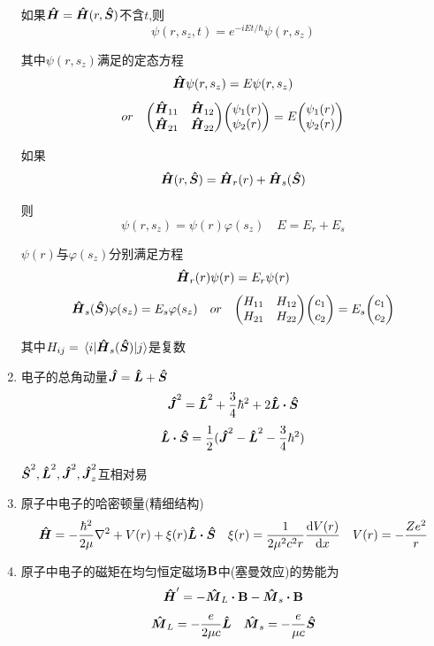 \documentclass{article}
\begin{document}
\begin{formal}
\begin{enumerate}
                  如果$\vu*{H} = \vu*{H}(r,\vu*{S})$不含$t$,则
                  $$ \psi(r,s_{z},t) = e^{-iEt/\hbar} \psi(r,s_{z}) $$

                  其中$\psi(r,s_{z})$满足的定态方程
                  $$ \vu*{H} \psi(r,s_{z}) = E \psi(r,s_{z}) $$
                  $$ 
                  or \quad \mqty(\vu*{H}_{11} & \vu*{H}_{12} \\ \vu*{H}_{21} & \vu*{H}_{22}) 
                  \mqty(\psi_{1}(r) \\ \psi_{2}(r)) = E \mqty( \psi_{1}(r) \\ \psi_{2}(r) )
                  $$

                  如果
                  $$ \vu*{H}(r,\vu*{S}) = \vu*{H}_{r}(r) + \vu*{H}_{s}(\vu*{S})  $$

                  则
                  $$ \psi(r,s_{z}) = \psi(r)\varphi(s_{z}) \quad E = E_{r} + E_{s} $$

                  $\psi(r)$与$\varphi(s_{z})$分别满足方程
                  $$ \vu*{H}_{r}(r) \psi(r) = E_{r}\psi(r) $$
                  $$ 
                  \vu*{H}_{s}(\vu*{S}) \varphi(s_{z}) = E_{s} \varphi(s_{z}) \quad or \quad 
                  \mqty(H_{11} & H_{12} \\ H_{21} & H_{22}) \mqty(c_{1} \\ c_{2}) = E_{s} \mqty(c_{1} \\ c_{2})
                  $$

                  其中$ H_{ij} = \mel{i}{\vu*{H}_{s}(\vu*{S})}{j}$是复数

                  \item 电子的总角动量$ \vu*{J} = \vu*{L} + \vu*{S} $
                  $$
                  \vu*{J}^{2} = \vu*{L}^{2} + \frac{3}{4} \hbar^{2} + 2\vu*{L} \vdot \vu*{S}
                  $$
                  $$
                  \vu*{L} \vdot \vu*{S} = \frac{1}{2} (\vu*{J}^{2} - \vu*{L}^{2} - \frac{3}{4}\hbar^{2} )
                  $$

                  $\vu*{S}^{2},\vu*{L}^{2},\vu*{J}^{2},\vu*{J}_{z}^{2}$互相对易

            \item 原子中电子的哈密顿量(精细结构)
                  $$ 
                  \vu*{H} = -\frac{\hbar^{2}}{2\mu}\nabla^{2} + V(r) + \xi(r) \vu*{L} \vdot \vu*{S} \quad 
                  \xi(r) = \frac{1}{2\mu^{2}c^{2}r}\dv{V(r)}{x} \quad V(r) = -\frac{Ze^{2}}{r}  
                  $$

            \item 原子中电子的磁矩在均匀恒定磁场$\vb{B}$中(塞曼效应)的势能为
                  $$
                  \vu*{H}' = - \vu*{M}_{L} \vdot \vb{B} - \vu*{M}_{s} \vdot \vb{B}
                  $$
                  $$
                  \vu*{M}_{L} = -\frac{e}{2\mu c}\vu*{L} \quad \vu*{M}_{s} = - \frac{e}{\mu c}\vu*{S}
                  $$


\end{enumerate}
\end{formal}
\end{document}
